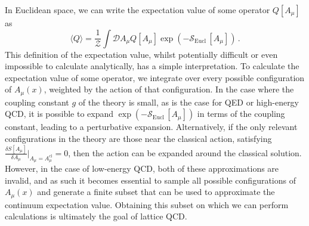 In Euclidean space, we can write the expectation value of some operator $Q[A_\mu]$ as~\cite{Luscher:1984xn}
%
\begin{equation}
\langle Q \rangle = \frac{1}{\mathcal{Z}}\int \mathcal{D} A_\mu Q[A_\mu] \exp\left(-\mathcal{S}_{\text{Eucl}}\,[A_\mu]\right)\, .
\end{equation}
%
This definition of the expectation value, whilst potentially difficult or even impossible to calculate analytically, has a simple interpretation. To calculate the expectation value of some operator, we integrate over every possible configuration of $A_\mu(x)$, weighted by the action of that configuration. In the case where the coupling constant $g$ of the theory is small, as is the case for QED or high-energy QCD, it is possible to expand $\exp\left(-\mathcal{S}_{\text{Eucl}}\,[A_\mu]\right)$ in terms of the coupling constant, leading to a perturbative expansion. Alternatively, if the only relevant configurations in the theory are those near the classical action, satisfying $\frac{\delta S[A_\mu]}{\delta A_\mu}\big|_{A_\mu = A_\mu^\text{cl}}=0$, then the action can be expanded around the classical solution. However, in the case of low-energy QCD, both of these approximations are invalid, and as such it becomes essential to sample all possible configurations of $A_\mu(x)$ and generate a finite subset that can be used to approximate the continuum expectation value. Obtaining this subset on which we can perform calculations is ultimately the goal of lattice QCD.

